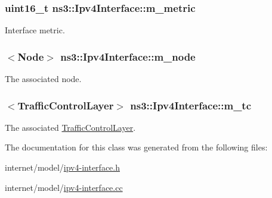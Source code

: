 \subsubsection[{\texorpdfstring{m\+\_\+metric}{m_metric}}]{\setlength{\rightskip}{0pt plus 5cm}uint16\+\_\+t ns3\+::\+Ipv4\+Interface\+::m\+\_\+metric\hspace{0.3cm}{\ttfamily [private]}}\hypertarget{classns3_1_1Ipv4Interface_a8f23bb2ff1470e29ba298169b38fb1c1}{}\label{classns3_1_1Ipv4Interface_a8f23bb2ff1470e29ba298169b38fb1c1}


Interface metric. 

\subsubsection[{\texorpdfstring{m\+\_\+node}{m_node}}]{$<${\bf Node}$>$ ns3\+::\+Ipv4\+Interface\+::m\+\_\+node\hspace{0.3cm}{\ttfamily [private]}}\hypertarget{classns3_1_1Ipv4Interface_a1790f3e2892779803599e5b7bb1fcbc9}{}\label{classns3_1_1Ipv4Interface_a1790f3e2892779803599e5b7bb1fcbc9}


The associated node. 

\subsubsection[{\texorpdfstring{m\+\_\+tc}{m_tc}}]{$<${\bf Traffic\+Control\+Layer}$>$ ns3\+::\+Ipv4\+Interface\+::m\+\_\+tc\hspace{0.3cm}{\ttfamily [private]}}\hypertarget{classns3_1_1Ipv4Interface_a41ba88695bd05ab856a01d2e5ce556c3}{}\label{classns3_1_1Ipv4Interface_a41ba88695bd05ab856a01d2e5ce556c3}


The associated \hyperlink{classns3_1_1TrafficControlLayer}{Traffic\+Control\+Layer}. 



The documentation for this class was generated from the following files\+:\begin{DoxyCompactItemize}
\item 
internet/model/\hyperlink{ipv4-interface_8h}{ipv4-\/interface.\+h}\item 
internet/model/\hyperlink{ipv4-interface_8cc}{ipv4-\/interface.\+cc}\end{DoxyCompactItemize}
